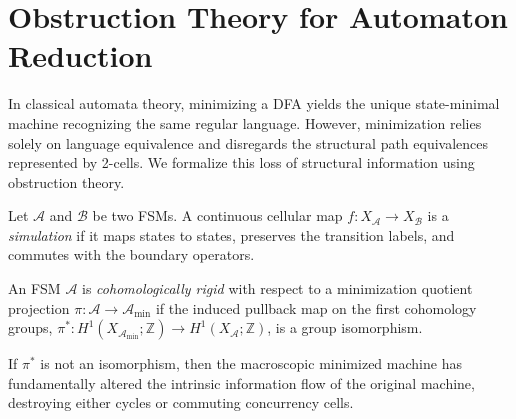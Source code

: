 \section{Obstruction Theory for Automaton Reduction}

In classical automata theory, minimizing a DFA yields the unique state-minimal machine recognizing the same regular language. However, minimization relies solely on language equivalence and disregards the structural path equivalences represented by 2-cells. We formalize this loss of structural information using obstruction theory.

Let $\mathcal{A}$ and $\mathcal{B}$ be two FSMs. A continuous cellular map $f: X_\mathcal{A} \to X_\mathcal{B}$ is a \emph{simulation} if it maps states to states, preserves the transition labels, and commutes with the boundary operators.

\begin{definition}
An FSM $\mathcal{A}$ is \emph{cohomologically rigid} with respect to a minimization quotient projection $\pi: \mathcal{A} \to \mathcal{A}_{\text{min}}$ if the induced pullback map on the first cohomology groups, $\pi^*: H^1(X_{\mathcal{A}_{\text{min}}}; \mathbb{Z}) \to H^1(X_\mathcal{A}; \mathbb{Z})$, is a group isomorphism.
\end{definition}

If $\pi^*$ is not an isomorphism, then the macroscopic minimized machine has fundamentally altered the intrinsic information flow of the original machine, destroying either cycles or commuting concurrency cells.

